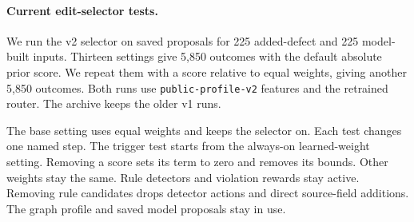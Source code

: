 \paragraph{Current edit-selector tests.}

We run the v2 selector on saved proposals for 225 added-defect and 225
model-built inputs. Thirteen settings give 5,850 outcomes with the default
absolute prior score. We repeat them with a score relative to equal weights,
giving another 5,850 outcomes. Both runs use \texttt{public-profile-v2}
features and the retrained router. The archive keeps the older v1 runs.

The base setting uses equal weights and keeps the selector on.
Each test changes one named step. The trigger test starts from the
always-on learned-weight setting. Removing a score sets its term to zero
and removes its bounds. Other weights stay the same.
Rule detectors and violation rewards stay active.
Removing rule candidates drops detector actions and direct source-field
additions. The graph profile and saved model proposals stay in use.

